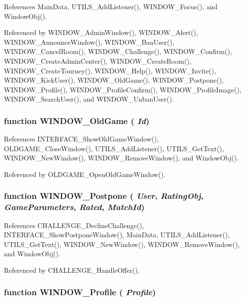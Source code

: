 References MainData, UTILS\_\-AddListener(), WINDOW\_\-Focus(), and WindowObj().

Referenced by WINDOW\_\-AdminWindow(), WINDOW\_\-Alert(), WINDOW\_\-AnnounceWindow(), WINDOW\_\-BanUser(), WINDOW\_\-CancelRoom(), WINDOW\_\-Challenge(), WINDOW\_\-Confirm(), WINDOW\_\-CreateAdminCenter(), WINDOW\_\-CreateRoom(), WINDOW\_\-CreateTourney(), WINDOW\_\-Help(), WINDOW\_\-Invite(), WINDOW\_\-KickUser(), WINDOW\_\-OldGame(), WINDOW\_\-Postpone(), WINDOW\_\-Profile(), WINDOW\_\-ProfileConfirm(), WINDOW\_\-ProfileImage(), WINDOW\_\-SearchUser(), and WINDOW\_\-UnbanUser().
\subsubsection[WINDOW\_\-OldGame]{\setlength{\rightskip}{0pt plus 5cm}function WINDOW\_\-OldGame ( {\em Id})}\label{window_2window_8js_76f9685e2f3edd1a2ac62bd9f921da86}




References INTERFACE\_\-ShowOldGameWindow(), OLDGAME\_\-CloseWindow(), UTILS\_\-AddListener(), UTILS\_\-GetText(), WINDOW\_\-NewWindow(), WINDOW\_\-RemoveWindow(), and WindowObj().

Referenced by OLDGAME\_\-OpenOldGameWindow().
\subsubsection[WINDOW\_\-Postpone]{\setlength{\rightskip}{0pt plus 5cm}function WINDOW\_\-Postpone ( {\em User}, \/   {\em RatingObj}, \/   {\em GameParameters}, \/   {\em Rated}, \/   {\em MatchId})}\label{window_2window_8js_7cfdf5bbaf420983794fe54e20ee31d0}




References CHALLENGE\_\-DeclineChallenge(), INTERFACE\_\-ShowPostponeWindow(), MainData, UTILS\_\-AddListener(), UTILS\_\-GetText(), WINDOW\_\-NewWindow(), WINDOW\_\-RemoveWindow(), and WindowObj().

Referenced by CHALLENGE\_\-HandleOffer().
\subsubsection[WINDOW\_\-Profile]{\setlength{\rightskip}{0pt plus 5cm}function WINDOW\_\-Profile ( {\em Profile})}\label{window_2window_8js_200e97ff4969f4c9092c6ac314e06c1e}


